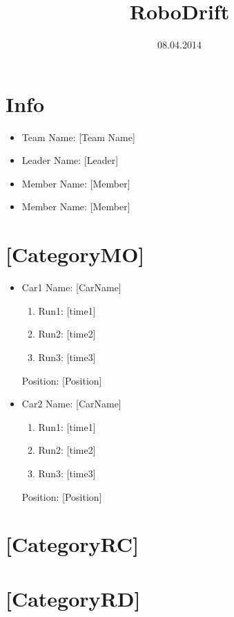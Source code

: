 \documentclass[a4paper,11pt]{article}
\title{RoboDrift}
\date{08.04.2014}
\begin{document}
\maketitle
\thispagestyle{fancy}

\section{Info}

\begin{itemize}
\item Team Name: [Team Name]
\item Leader Name: [Leader]
\item Member Name: [Member]
\item Member Name: [Member]
\end{itemize}

\section{[CategoryMO]}

\begin{itemize}

\item Car1 Name: [CarName]
\begin{enumerate}
\item Run1: [time1]
\item Run2: [time2]
\item Run3: [time3]
\end{enumerate}
Position: [Position]

\item Car2 Name: [CarName]
\begin{enumerate}
\item Run1: [time1]
\item Run2: [time2]
\item Run3: [time3]
\end{enumerate}
Position: [Position]

\end{itemize}

\section{[CategoryRC]}

\section{[CategoryRD]}
\end{document}
